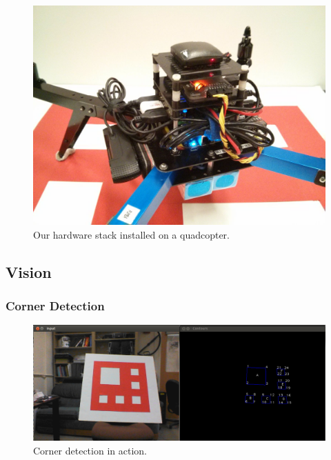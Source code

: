 \documentclass[10pt]{scrartcl} %
\begin{document}
\begin{figure}[h]
    \centering
    \includegraphics[width=\textwidth]{images/hardware.jpg}
    \caption{Our hardware stack installed on a quadcopter.}
    \label{fig:hardware}
\end{figure}




\subsection{Vision}

\subsubsection{Corner Detection}

\begin{figure}[h]
    \centering
    \includegraphics[width=\textwidth]{images/corners.png}
    \caption{Corner detection in action.}
    \label{fig:corners}
\end{figure}
\end{document}
